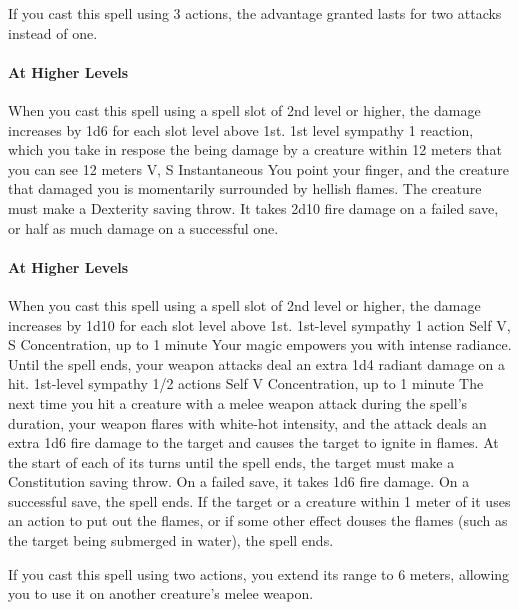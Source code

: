         If you cast this spell using 3 actions, the advantage granted lasts for two attacks instead of one.

        \paragraph{At Higher Levels}
        When you cast this spell using a spell slot of 2nd level or higher, the damage increases by 1d6 for each slot level above 1st.
        {1st level sympathy}
        {1 reaction, which you take in respose the being damage by a creature within 12 meters that you can see}
        {12 meters}
        {V, S}
        {Instantaneous}
        You point your finger, and the creature that damaged you is momentarily surrounded by hellish flames.
        The creature must make a Dexterity saving throw.
        It takes 2d10 fire damage on a failed save, or half as much damage on a successful one.

        \paragraph{At Higher Levels}
        When you cast this spell using a spell slot of 2nd level or higher, the damage increases by 1d10 for each slot level above 1st.
        {1st-level sympathy}
        {1 action}
        {Self}
        {V, S}
        {Concentration, up to 1 minute}
        Your magic empowers you with intense radiance.
        Until the spell ends, your weapon attacks deal an extra 1d4 radiant damage on a hit.
        {1st-level sympathy}
        {1/2 actions}
        {Self}
        {V}
        {Concentration, up to 1 minute}
        The next time you hit a creature with a melee weapon attack during the spell's duration, your weapon flares with white-hot intensity, and the attack deals an extra 1d6 fire damage to the target and causes the target to ignite in flames.
        At the start of each of its turns until the spell ends, the target must make a Constitution saving throw.
        On a failed save, it takes 1d6 fire damage.
        On a successful save, the spell ends.
        If the target or a creature within 1 meter of it uses an action to put out the flames, or if some other effect douses the flames (such as the target being submerged in water), the spell ends.

        If you cast this spell using two actions, you extend its range to 6 meters, allowing you to use it on another creature's melee weapon.

